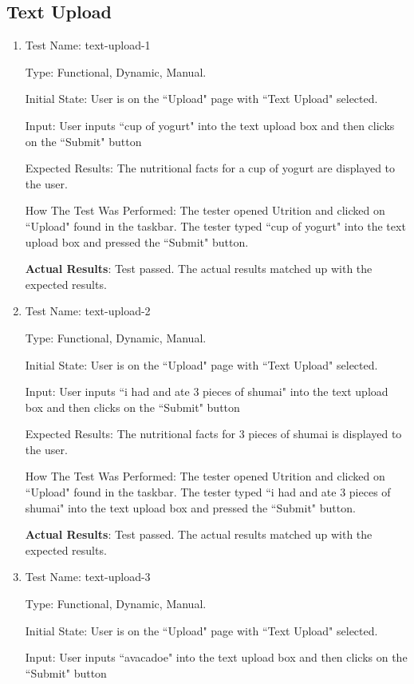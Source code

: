 \documentclass[12pt, titlepage]{article}
\begin{document}
	\subsection{Text Upload}
	\begin{enumerate}
		
		\item{Test Name: text-upload-1}
		
		Type: Functional, Dynamic, Manual.
		
		Initial State: User is on the ``Upload" page with ``Text Upload" selected.
		
		Input: User inputs ``cup of yogurt" into the text upload box and then clicks on the ``Submit" button
		
		Expected Results: The nutritional facts for a cup of yogurt are displayed to the user.
		
		How The Test Was Performed: The tester opened Utrition and clicked on ``Upload" found in the taskbar. The tester typed ``cup of yogurt" into the text upload box and pressed the ``Submit" button.
		
		\textbf{Actual Results}: Test passed. The actual results matched up with the expected results.
		
		\item{Test Name: text-upload-2}
		
		Type: Functional, Dynamic, Manual.
		
		Initial State: User is on the ``Upload" page with ``Text Upload" selected.
		
		Input: User inputs ``i had and ate 3 pieces of shumai" into the text upload box and then clicks on the ``Submit" button
		
		Expected Results: The nutritional facts for 3 pieces of shumai is displayed to the user.
		
		How The Test Was Performed: The tester opened Utrition and clicked on ``Upload" found in the taskbar. The tester typed ``i had and ate 3 pieces of shumai" into the text upload box and pressed the ``Submit" button.
		
		\textbf{Actual Results}: Test passed. The actual results matched up with the expected results.
		
		\item{Test Name: text-upload-3}
		
		Type: Functional, Dynamic, Manual.
		
		Initial State: User is on the ``Upload" page with ``Text Upload" selected.
		
		Input: User inputs ``avacadoe" into the text upload box and then clicks on the ``Submit" button
		

\end{enumerate}
\end{document}
